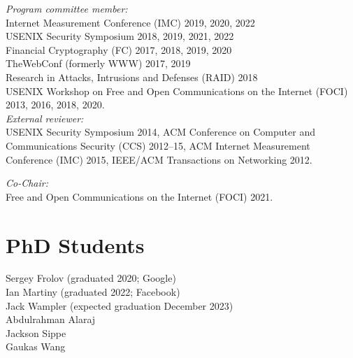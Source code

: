 \documentclass[margin,11pt]{res} %
\begin{document}
     \emph{Program committee member:}\\
            Internet Measurement Conference (IMC) 2019, 2020, 2022  \\
            USENIX Security Symposium 2018, 2019, 2021, 2022    \\
            Financial Cryptography (FC) 2017, 2018, 2019, 2020 \\
            TheWebConf (formerly WWW) 2017, 2019 \\
            Research in Attacks, Intrusions and Defenses (RAID) 2018 \\
            USENIX Workshop on Free and Open Communications on the Internet (FOCI) 2013, 2016, 2018, 2020. \\

    \emph{External reviewer:}\\
    USENIX Security Symposium 2014,
    ACM Conference on Computer and Communications Security (CCS) 2012--15,
    ACM Internet Measurement Conference (IMC) 2015,
    IEEE/ACM Transactions on Networking 2012.

    \emph{Co-Chair:}\\
    Free and Open Communications on the Internet (FOCI) 2021.

\vspace{6pt}
\section{\large PhD Students}
    Sergey Frolov (graduated 2020; Google) \\
    Ian Martiny (graduated 2022; Facebook) \\
    Jack Wampler (expected graduation December 2023) \\ %
    Abdulrahman Alaraj \\   %
    Jackson Sippe \\ %
    Gaukas Wang \\ %

\vspace{6pt}
\end{document}
